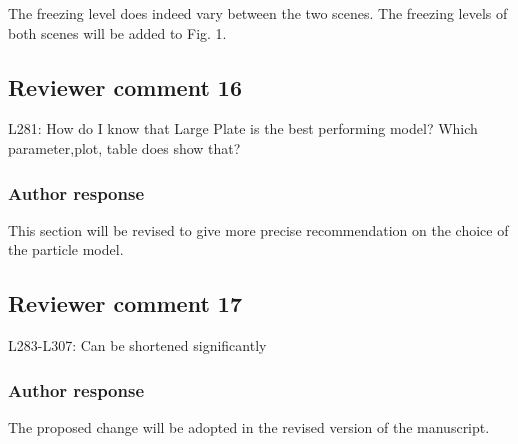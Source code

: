 \documentclass[11pt]{scrartcl}
\begin{document}
The freezing level does indeed vary between the two scenes. The freezing levels of both
scenes will be added to Fig. 1.

\subsection{Reviewer comment 16}

L281: How do I know that Large Plate is the best performing model? Which parameter,plot, table does show that?

\subsubsection*{Author response}

This section will be revised to give more precise recommendation on the choice of the
particle model.

\subsection*{Reviewer comment 17}
L283-L307: Can be shortened significantly

\subsubsection*{Author response}

The proposed change will be adopted in the revised version of the manuscript.
\end{document}
